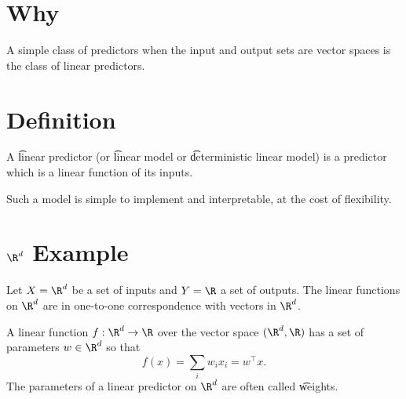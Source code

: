 

\section*{Why}

A simple class of predictors when the input and output sets are vector spaces is the class of linear predictors.


\section*{Definition}

A \t{linear predictor} (or \t{linear model} or \t{deterministic linear model}) is a predictor which is a linear function of its inputs.

Such a model is simple to implement and interpretable, at the cost of flexibility.

\section*{$\R ^d$ Example}

Let $X = \R ^d$ be a set of inputs and $Y = \R $ a set of outputs.
The linear functions on $\R ^d$ are in one-to-one correspondence with vectors in $\R ^d$.

A linear function $f: \R ^d \to \R $ over the vector space $(\R ^d, \R )$ has a set of parameters $w \in \R ^d$ so that
\[
f(x) = \sum_{i} w_i x_i = w^\top  x.
\]
The parameters of a linear predictor on $\R ^d$ are often called \t{weights}.

\blankpage